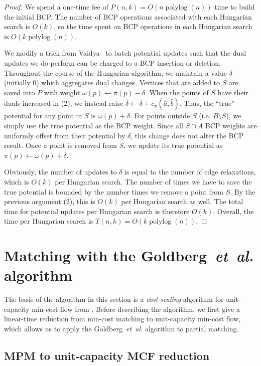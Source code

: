\documentclass[11pt]{article}
\def\etal{\textsl{et~al.}}
\def\polylog{\mathop{\mathrm{polylog}}}
\theoremstyle{plain}
\begin{document}
\begin{figure*}
\begin{proof}
We spend a one-time fee of $P(n, k) = O(n \polylog(n))$ time to build the
initial BCP.
The number of BCP operations associated with each Hungarian search is $O(k)$,
so the time spent on BCP operations in each Hungarian search is
$O(k \polylog(n))$.

We modify a trick from Vaidya~\cite{Vaidya89} to batch potential updates such
that the dual updates we do perform can be charged to a BCP insertion or
deletion.
Throughout the course of the Hungarian algorithm, we maintain a value $\delta$
(initially 0) which aggregates dual changes.
Vertices that are added to $S$ are saved into $P$ with weight
$\omega(p) \gets \pi(p) - \delta$.
When the points of $S$ have their duals increased in (2), we instead raise
$\delta \gets \delta + c_\pi(\hat{a}, \hat{b})$.
Thus, the ``true'' potential for any point in $S$ is $\omega(p) + \delta$.
For points outside $S$ (i.e. $B \setminus S$), we simply use the true potential
as the BCP weight.
Since all $S \cap A$ BCP weights are uniformly offset from their potential by
$\delta$, this change does not alter the BCP result.
Once a point is removed from $S$, we update its true potential as
$\pi(p) \gets \omega(p) + \delta$.

Obviously, the number of updates to $\delta$ is equal to the number of edge
relaxations, which is $O(k)$ per Hungarian search.
The number of times we have to save the true potential is bounded by the number
times we remove a point from $S$.
By the previous argument (2), this is $O(k)$ per Hungarian search as well.
The total time for potential updates per Hungarian search is therefore $O(k)$.
Overall, the time per Hungarian search is $T(n, k) = O(k\polylog(n))$.
\end{proof}


\section{Matching with the Goldberg~{\etal} algorithm}
\label{section:goldberg}

The basis of the algorithm in this section is a \emph{cost-scaling} algorithm
for unit-capacity min-cost flow from \cite{GHKT17}.
Before describing the algorithm, we first give a linear-time reduction from
min-cost matching to unit-capacity min-cost flow, which allows us to apply the
Goldberg~{\etal} algorithm to partial matching.

\subsection{MPM to unit-capacity MCF reduction}
\label{subsection:mcm_mcf_reduction}


\end{figure*}
\end{document}

